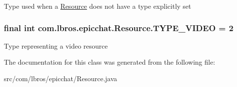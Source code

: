 Type used when a \hyperlink{classcom_1_1lbros_1_1epicchat_1_1_resource}{Resource} does not have a type explicitly set \hypertarget{classcom_1_1lbros_1_1epicchat_1_1_resource_addfd165d7ba653dab61af55ce76f112c}{
\subsubsection[{T\-Y\-P\-E\-\_\-\-V\-I\-D\-E\-O}]{\setlength{\rightskip}{0pt plus 5cm}final int com.\-lbros.\-epicchat.\-Resource.\-T\-Y\-P\-E\-\_\-\-V\-I\-D\-E\-O = 2\hspace{0.3cm}{\ttfamily [static]}}}\label{classcom_1_1lbros_1_1epicchat_1_1_resource_addfd165d7ba653dab61af55ce76f112c}
Type representing a video resource 

The documentation for this class was generated from the following file\-:\begin{DoxyCompactItemize}
\item 
src/com/lbros/epicchat/Resource.\-java\end{DoxyCompactItemize}
